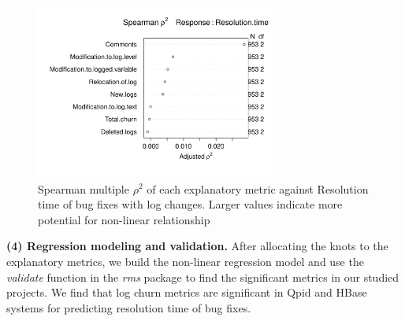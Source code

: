 \begin{figure}[t]
	\begin{minipage}[b]{1\columnwidth}
			\centering 
		\hspace*{-2cm}	\includegraphics[width=0.7\textwidth]{QpidDF}	
		
	\end{minipage}
	\captionsetup{labelsep = colon}
	\hspace*{1.7cm}\caption{Spearman multiple $\rho^{2}$ of each explanatory metric against Resolution time of bug fixes with log changes. Larger values indicate more potential for non-linear relationship \label{fig:Spearman}}
\end{figure}




\textbf{(4) Regression modeling and validation.} After allocating the knots to the explanatory metrics, we build the non-linear regression model and use the \textsl{validate} function in the \textsl{rms} package to find the significant metrics in our studied projects. We find that log churn metrics are significant in Qpid and HBase systems for predicting resolution time of bug fixes. 

